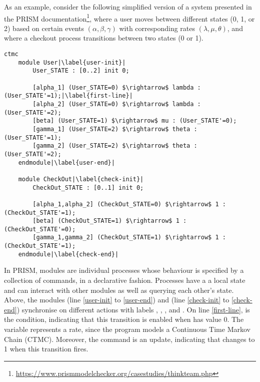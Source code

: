As an example, consider the following simplified version of a system
presented in the PRISM
documentation\footnote{\url{https://www.prismmodelchecker.org/casestudies/thinkteam.php}},
where a user moves between different states (0, 1, or 2) based on
certain events $(\alpha, \beta, \gamma)$ with corresponding rates
$(\lambda, \mu, \theta)$, and where a checkout process transitions
between two states (0 or 1).
%
\begin{lstlisting}[style=prism-color,% caption={A PRISM example},captionpos=b,
  frame=none,label={example1},escapechar=|]
	ctmc 
	module User|\label{user-init}|
		User_STATE : [0..2] init 0;
	
		[alpha_1] (User_STATE=0) $\rightarrow$ lambda : (User_STATE'=1);|\label{first-line}|
		[alpha_2] (User_STATE=0) $\rightarrow$ lambda : (User_STATE'=2);
		[beta] (User_STATE=1) $\rightarrow$ mu : (User_STATE'=0);
		[gamma_1] (User_STATE=2) $\rightarrow$ theta : (User_STATE'=1);
		[gamma_2] (User_STATE=2) $\rightarrow$ theta : (User_STATE'=2);
	endmodule|\label{user-end}|
	
	module CheckOut|\label{check-init}|
		CheckOut_STATE : [0..1] init 0;
	
		[alpha_1,alpha_2] (CheckOut_STATE=0) $\rightarrow$ 1 : (CheckOut_STATE'=1);
		[beta] (CheckOut_STATE=1) $\rightarrow$ 1 : (CheckOut_STATE'=0);
		[gamma_1,gamma_2] (CheckOut_STATE=1) $\rightarrow$ 1 : (CheckOut_STATE'=1);
	endmodule|\label{check-end}|
\end{lstlisting}
%
In PRISM, modules are individual processes whose behaviour is
specified by a collection of commands, in a declarative fashion.
Processes have a a local state and can interact with other modules as
well as querying each other's state. Above, the modules
 (line \ref{user-init} to \ref{user-end}) and
 (line \ref{check-init} to \ref{check-end})
synchronise on different actions with labels ,
, ,  and
. On line \ref{first-line},
 is the condition, indicating that this
transition is enabled when  has value 0. The
variable  represents a rate, since the program
models a Continuous Time Markov Chain (CTMC). Moreover, the command
 is an update, indicating that
 changes to 1 when this transition fires.

